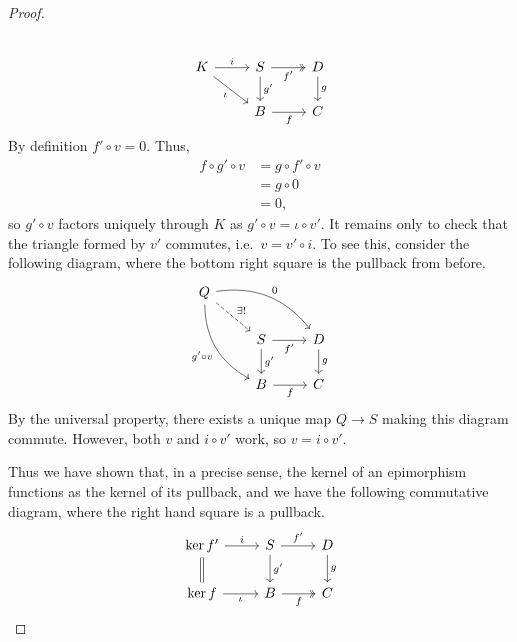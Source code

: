 \documentclass[main.tex]{subfiles}
\begin{document}
\begin{proof}
\begin{equation*}
\begin{tikzcd}
      \\
      K
      \arrow[r, "i"]
      \arrow[dr, swap, "\iota"]
      & S
      \arrow[r, twoheadrightarrow, swap, "f'"]
      \arrow[d, "g'"]
      & D
      \arrow[d, "g"]
      \\
      & B
      \arrow[r, swap, "f"]
      & C
    \end{tikzcd}
  \end{equation*}
  By definition $f' \circ v = 0$. Thus,
  \begin{align*}
    f \circ g' \circ v &= g \circ f' \circ v \\
    &= g \circ 0 \\
    &= 0,
  \end{align*}
  so $g' \circ v$ factors uniquely through $K$ as $g' \circ v = \iota \circ v'$. It remains only to check that the triangle formed by $v'$ commutes, i.e.\ $v = v' \circ i$. To see this, consider the following diagram, where the bottom right square is the pullback from before.
  \begin{equation*}
    \begin{tikzcd}
      Q
      \arrow[drr, bend left, "0"]
      \arrow[ddr, bend right, swap, "g' \circ v"]
      \arrow[dr, dashed, "\exists!"]
      \\
      & S
      \arrow[r, swap, "f'"]
      \arrow[d, "g'"]
      & D
      \arrow[d, "g"]
      \\
      & B
      \arrow[r, swap, "f"]
      & C
    \end{tikzcd}
  \end{equation*}
  By the universal property, there exists a unique map $Q \to S$ making this diagram commute. However, both $v$ and $i \circ v'$ work, so $v = i \circ v'$.

  Thus we have shown that, in a precise sense, the kernel of an epimorphism functions as the kernel of its pullback, and we have the following commutative diagram, where the right hand square is a pullback.
  \begin{equation*}
    \begin{tikzcd}
      \ker f'
      \arrow[d, equals]
      \arrow[r, "i"]
      & S
      \arrow[r, "f'"]
      \arrow[d, "g'"]
      & D
      \arrow[d, "g"]
      \\
      \ker f
      \arrow[r, swap, "\iota"]
      & B
      \arrow[r, twoheadrightarrow, swap, "f"]
      & C
    \end{tikzcd}
  \end{equation*}
\end{proof}
\end{document}

